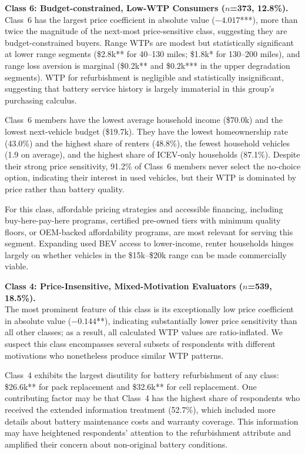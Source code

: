 \documentclass[a4paper,fleqn]{cas-sc}   %
\begin{document}
\medskip

\noindent\textbf{Class 6: Budget-constrained, Low-WTP Consumers ($n$=373, 12.8\%).}\\
Class~6 has the largest price coefficient in absolute value ($-4.017$***), more than twice the magnitude of the next-most price-sensitive class, suggesting they are budget-constrained buyers. Range WTPs are modest but statistically significant at lower range segments (\$2.8k** for 40--130 miles; \$1.8k* for 130--200 miles), and range loss aversion is marginal (\$0.2k** and \$0.2k*** in the upper degradation segments). WTP for refurbishment is negligible and statistically insignificant, suggesting that battery service history is largely immaterial in this group's purchasing calculus.

Class~6 members have the lowest average household income (\$70.0k) and the lowest next-vehicle budget (\$19.7k). They have the lowest homeownership rate (43.0\%) and the highest share of renters (48.8\%), the fewest household vehicles (1.9 on average), and the highest share of ICEV-only households (87.1\%). Despite their strong price sensitivity, 91.2\% of Class~6 members never select the no-choice option, indicating their interest in used vehicles, but their WTP is dominated by price rather than battery quality.

For this class, affordable pricing strategies and accessible financing, including buy-here-pay-here programs, certified pre-owned tiers with minimum quality floors, or OEM-backed affordability programs, are most relevant for serving this segment. Expanding used BEV access to lower-income, renter households hinges largely on whether vehicles in the \$15k--\$20k range can be made commercially viable.

\medskip

\noindent\textbf{Class 4: Price-Insensitive, Mixed-Motivation Evaluators ($n$=539, 18.5\%).}\\
The most prominent feature of this class is its exceptionally low price coefficient in absolute value ($-0.144$**), indicating substantially lower price sensitivity than all other classes; as a result, all calculated WTP values are ratio-inflated. We suspect this class encompasses several subsets of respondents with different motivations who nonetheless produce similar WTP patterns.

Class~4 exhibits the largest disutility for battery refurbishment of any class: \$26.6k** for pack replacement and \$32.6k** for cell replacement. One contributing factor may be that Class~4 has the highest share of respondents who received the extended information treatment (52.7\%), which included more details about battery maintenance costs and warranty coverage. This information may have heightened respondents' attention to the refurbishment attribute and amplified their concern about non-original battery conditions. 
\end{document}
